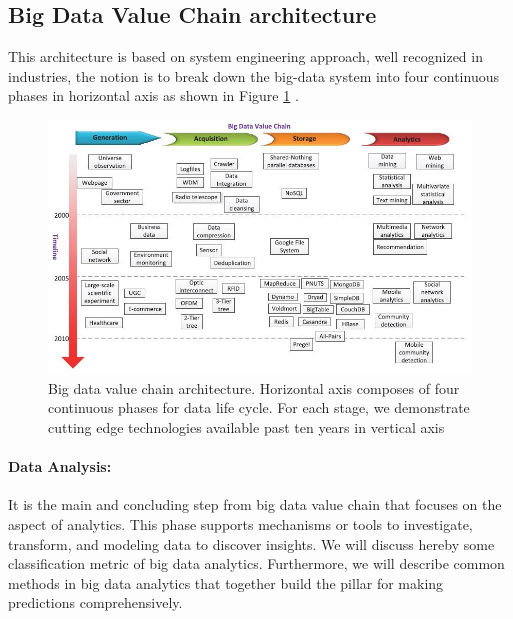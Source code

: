 \documentclass[runningheads]{llncs}
\begin{document}
\subsection{Big Data Value Chain architecture}
This architecture is based on system engineering approach, well recognized in industries, the notion is to break down the big-data system into four continuous phases in horizontal axis as shown in Figure \ref{fig:Figure4} \cite{5}.
\begin{figure}[htbp]
	\centering
	\vspace{-0.85cm}
	\hspace*{-0.45cm}
	\includegraphics[scale=0.6]{Figure4.jpg}
	\caption{Big data value chain architecture. Horizontal axis composes of four continuous phases for data life cycle. For each stage, we demonstrate cutting edge technologies available past ten years in vertical axis}
	\label{fig:Figure4}
	\vspace{3.5cm}
\end{figure}

\paragraph{Data Analysis:} It is the main and concluding step from big data value chain that focuses on the aspect of analytics. This phase supports mechanisms or tools to investigate, transform, and modeling data to discover insights. We will discuss hereby some classification metric of big data analytics. Furthermore, we will describe common methods in big data analytics that together build the pillar for making predictions comprehensively.
\end{document}
